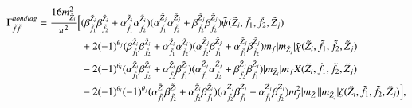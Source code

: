 \documentclass[final,3p,times,pdflatex]{elsarticle}
\begin{document}
\begin{equation}
\begin{aligned}
\Gamma_{\tilde{f} \tilde{f}}^{nondiag} =  {16 m_{\tilde{Z}_i}^2 \over \pi^2}\Big[&({\beta_{\tilde{f}_1}^{\tilde{Z}_i}}{\beta_{\tilde{f}_2}^{\tilde{Z}_i}} + {\alpha_{\tilde{f}_1}^{\tilde{Z}_i}}{\alpha_{\tilde{f}_2}^{\tilde{Z}_i}})({\alpha_{\tilde{f}_1}^{\tilde{Z}_j}}{\alpha_{\tilde{f}_2}^{\tilde{Z}_j}} + {\beta_{\tilde{f}_2}^{\tilde{Z}_j}}{\beta_{\tilde{f}_2}^{\tilde{Z}_j}})\tilde{\psi}(\tilde{Z}_i,\tilde{f}_1, \tilde{f}_2, \tilde{Z}_j) \\ & + 2(-1)^{\theta_j}({\beta_{\tilde{f}_1}^{\tilde{Z}_i}}{\beta_{\tilde{f}_2}^{\tilde{Z}_i}} + {\alpha_{\tilde{f}_1}^{\tilde{Z}_i}} {\alpha_{\tilde{f}_2}^{\tilde{Z}_i}})({\alpha_{\tilde{f}_2}^{\tilde{Z}_j}}{\beta_{\tilde{f}_1}^{\tilde{Z}_j}} + {\alpha_{\tilde{f}_1}^{\tilde{Z}_j}}{\beta_{\tilde{f}_2}^{\tilde{Z}_j}})m_{f} |m_{\tilde{Z}_j}| \tilde{\chi}(\tilde{Z}_i,\tilde{f}_1,\tilde{f}_2,\tilde{Z}_j) \\ & - 2(-1)^{\theta_i}({\alpha_{\tilde{f}_1}^{\tilde{Z}_i}}{\beta_{\tilde{f}_2}^{\tilde{Z}_i}} + {\alpha_{\tilde{f}_2}^{\tilde{Z}_i}}{\beta_{\tilde{f}_1}^{\tilde{Z}_i}})({\alpha_{\tilde{f}_1}^{\tilde{Z}_j}}{\alpha_{\tilde{f}_2}^{\tilde{Z}_j}} + {\beta_{\tilde{f}_2}^{\tilde{Z}_j}}{\beta_{\tilde{f}_1}^{\tilde{Z}_j}})|m_{\tilde{Z}_i}|m_{f}X(\tilde{Z}_i,\tilde{f}_1,\tilde{f}_2,\tilde{Z}_j) \\ & - 2(-1)^{\theta_i}(-1)^{\theta_j}({\alpha_{\tilde{f}_1}^{\tilde{Z}_i}}{\beta_{\tilde{f}_2}^{\tilde{Z}_i}} + {\alpha_{\tilde{f}_2}^{\tilde{Z}_i}} {\beta_{\tilde{f}_1}^{\tilde{Z}_i}})({\alpha_{\tilde{f}_2}^{\tilde{Z}_j}}{\beta_{\tilde{f}_1}^{\tilde{Z}_j}} + {\alpha_{\tilde{f}_1}^{\tilde{Z}_j}} {\beta_{\tilde{f}_2}^{\tilde{Z}_j}})m_{f}^2|m_{\tilde{Z}_i}||m_{\tilde{Z}_j}|\zeta(\tilde{Z}_i,\tilde{f}_1,\tilde{f}_2,\tilde{Z}_j)\Big],
\end{aligned}
\end{equation}
\end{document}
